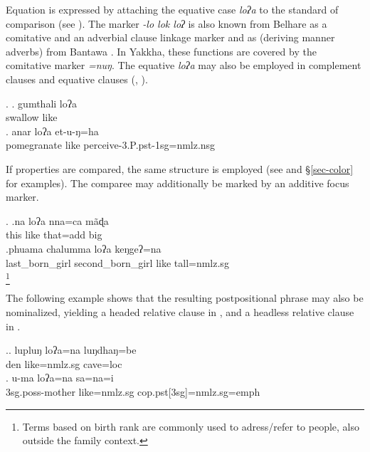 Equation is expressed by attaching the equative case \emph{loʔa}  to the standard of comparison (see \Next). The marker \emph{-lo \ti lok \ti loʔ} is also known from Belhare as a comitative and an adverbial clause linkage marker \citep{Bickel1993Belhare} and as  (deriving manner adverbs) from Bantawa  \citep[299]{Doornenbal2009A-grammar}. In Yakkha, these functions are covered by the comitative marker \emph{=nuŋ}. The equative  \emph{loʔa}  may also be employed in complement clauses and equative clauses (, ). 

 \ex. \ag. gumthali loʔa\\ 
 swallow like\\
  \bg. anar loʔa et-u-ŋ=ha\\ 
  pomegranate like perceive-{\sc 3.P.pst-1sg=nmlz.nsg}\\
   
  
If properties are compared, the same structure is employed (see \Next and §\ref{sec-color} for examples). The comparee may additionally be marked by an additive focus marker.
  
  \ex. \ag.na loʔa nna=ca mãɖa\\
this like that{\sc =add} big\\
  \bg.phuama chalumma loʔa keŋgeʔ=na\\
  last\_born\_girl  second\_born\_girl  like tall{\sc =nmlz.sg}\\
  \footnote{Terms based on birth rank are commonly used to adress/refer to people, also outside the family context.}

 The following example shows that the resulting postpositional phrase may also be nominalized, yielding a headed relative clause in \Next[a], and a headless relative clause in \Next[b]. 
 
  \ex.\ag. lupluŋ loʔa=na       luŋdhaŋ=be\\
  den like{\sc =nmlz.sg} cave{\sc =loc}\\
   
\bg.  u-ma              loʔa=na        sa=na=i\\
{\sc 3sg.poss-}mother like{\sc =nmlz.sg} {\sc cop.pst[3sg]=nmlz.sg=emph}\\
 

